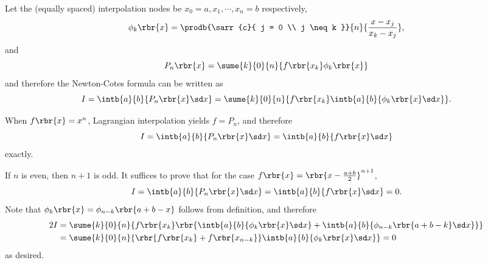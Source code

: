 \documentclass[english, nochinese]{../textmpls/pkupaper}
\begin{document}
\begin{thmquestion}
\ 
\begin{thmproof}
Let the (equally spaced) interpolation nodes be $ x_0 = a, x_1, \cdots, x_n = b $ respectively,
\begin{equation}
\phi_k \rbr{x} = \prodb{\sarr{c}{ j = 0 \\ j \neq k }}{n}{\frac{ x - x_j }{ x_k - x_j }},
\end{equation}
and
\begin{equation}
P_n \rbr{x} = \sume{k}{0}{n}{ f \rbr{x_k} \phi_k \rbr{x} }
\end{equation}
and therefore the Newton-Cotes formula can be written as
\begin{equation}
I = \intb{a}{b}{ P_n \rbr{x} \sd x } = \sume{k}{0}{n}{ f \rbr{x_k} \intb{a}{b}{ \phi_k \rbr{x} \sd x } }.
\end{equation}

When $ f \rbr{x} = x^n $, Lagrangian interpolation yields $ f = P_n $, and therefore
\begin{equation}
I = \intb{a}{b}{ P_n \rbr{x} \sd x } = \intb{a}{b}{ f \rbr{x} \sd x }
\end{equation}
exactly.

If $n$ is even, then $ n + 1 $ is odd. It suffices to prove that for the case $ f \rbr{x} = \rbr{ x - \frac{ a + b }{2} }^{ n + 1 } $,
\begin{equation}
I = \intb{a}{b}{ P_n \rbr{x} \sd x } = \intb{a}{b}{ f \rbr{x} \sd x } = 0.
\end{equation}
Note that $ \phi_k \rbr{x} = \phi_{ n - k } \rbr{ a + b - x } $ follows from definition, and therefore
\begin{equation}
\begin{split}
2 I &= \sume{k}{0}{n}{ f \rbr{x_k} \rbr{ \intb{a}{b}{ \phi_k \rbr{x} \sd x } + \intb{a}{b}{ \phi_{ n - k } \rbr{ a + b - k } \sd x } } } \\
&= \sume{k}{0}{n}{ \rbr{ f \rbr{x_k} + f \rbr{x_{ n - k }} } \intb{a}{b}{ \phi_k \rbr{x} \sd x } } = 0
\end{split}
\end{equation}
as desired.

\sqed
\end{thmproof}
\end{thmquestion}
\end{document}

